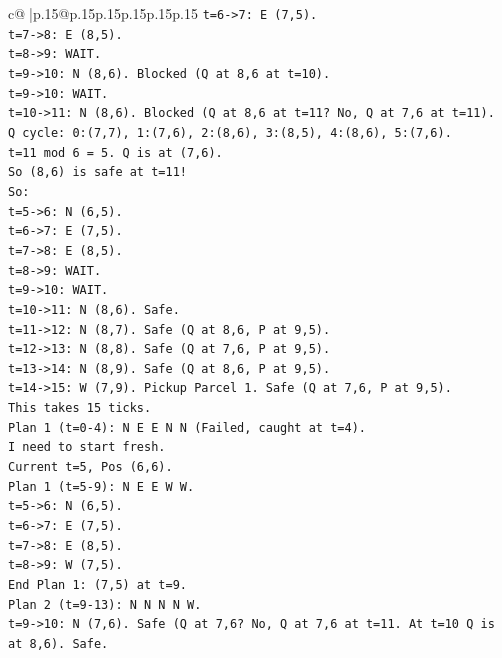 \documentclass{article}
\begin{document}
{\begin{supertabular}{c@{$\;$}|p{.15\linewidth}@{}p{.15\linewidth}p{.15\linewidth}p{.15\linewidth}p{.15\linewidth}p{.15\linewidth}}
{{{\texttt{t=6{-}>7: E (7,5).} \\
\texttt{t=7{-}>8: E (8,5).} \\
\texttt{t=8{-}>9: WAIT.} \\
\texttt{t=9{-}>10: N (8,6). Blocked (Q at 8,6 at t=10).} \\
\texttt{t=9{-}>10: WAIT.} \\
\texttt{t=10{-}>11: N (8,6). Blocked (Q at 8,6 at t=11? No, Q at 7,6 at t=11).} \\
\texttt{Q cycle: 0:(7,7), 1:(7,6), 2:(8,6), 3:(8,5), 4:(8,6), 5:(7,6).} \\
\texttt{t=11 mod 6 = 5. Q is at (7,6).} \\
\texttt{So (8,6) is safe at t=11!} \\
\texttt{So:} \\
\texttt{t=5{-}>6: N (6,5).} \\
\texttt{t=6{-}>7: E (7,5).} \\
\texttt{t=7{-}>8: E (8,5).} \\
\texttt{t=8{-}>9: WAIT.} \\
\texttt{t=9{-}>10: WAIT.} \\
\texttt{t=10{-}>11: N (8,6). Safe.} \\
\texttt{t=11{-}>12: N (8,7). Safe (Q at 8,6, P at 9,5).} \\
\texttt{t=12{-}>13: N (8,8). Safe (Q at 7,6, P at 9,5).} \\
\texttt{t=13{-}>14: N (8,9). Safe (Q at 8,6, P at 9,5).} \\
\texttt{t=14{-}>15: W (7,9). Pickup Parcel 1. Safe (Q at 7,6, P at 9,5).} \\
\texttt{This takes 15 ticks.} \\
\texttt{Plan 1 (t=0{-}4): N E E N N (Failed, caught at t=4).} \\
\texttt{I need to start fresh.} \\
\texttt{Current t=5, Pos (6,6).} \\
\texttt{Plan 1 (t=5{-}9): N E E W W.} \\
\texttt{t=5{-}>6: N (6,5).} \\
\texttt{t=6{-}>7: E (7,5).} \\
\texttt{t=7{-}>8: E (8,5).} \\
\texttt{t=8{-}>9: W (7,5).} \\
\texttt{End Plan 1: (7,5) at t=9.} \\
\texttt{Plan 2 (t=9{-}13): N N N N W.} \\
\texttt{t=9{-}>10: N (7,6). Safe (Q at 7,6? No, Q at 7,6 at t=11. At t=10 Q is at 8,6). Safe.} \\
}}}
\end{supertabular}}
\end{document}
